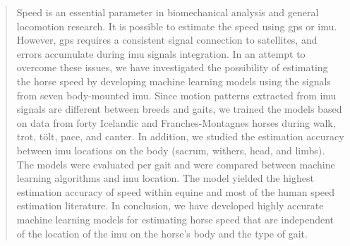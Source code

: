 \begin{quote}
Speed is an essential parameter in biomechanical analysis and general locomotion research. It is possible to estimate the speed using \gls{gps} or \gls{imu}. However, \gls{gps} requires a consistent signal connection to satellites, and errors accumulate during \gls{imu} signals integration. In an attempt to overcome these issues, we have investigated the possibility of estimating the horse speed by developing machine learning models using the signals from seven body-mounted \gls{imu}. Since motion patterns extracted from \gls{imu} signals are different between breeds and gaits, we trained the models based on data from forty Icelandic and Franches-Montagnes horses during walk, trot, tölt, pace, and canter. In addition, we studied the estimation accuracy between \gls{imu} locations on the body (sacrum, withers, head, and limbs). The models were evaluated per gait and were compared between machine learning algorithms and \gls{imu} location. The model yielded the highest estimation accuracy of speed within equine and most of the human speed estimation literature. In conclusion, we have developed highly accurate machine learning models for estimating horse speed that are independent of the location of the \gls{imu} on the horse's body and the type of gait.
\end{quote}

